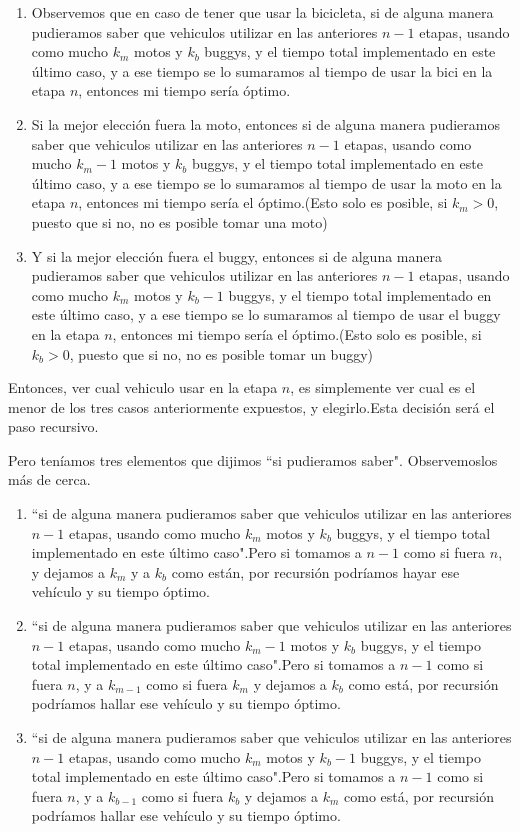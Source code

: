 \begin{enumerate}
	\item Observemos que en caso de tener que usar la bicicleta, si de alguna manera pudieramos saber que vehiculos utilizar en las anteriores $n-1$ etapas, usando como mucho $k_{m}$ motos y $k_{b}$ buggys, y el tiempo total implementado en este último caso, y a ese tiempo se lo sumaramos al tiempo de usar la bici en la etapa $n$, entonces mi tiempo sería óptimo.
	\item Si la mejor elección fuera la moto, entonces si de alguna manera pudieramos saber que vehiculos utilizar en las anteriores $n-1$ etapas, usando como mucho $k_{m}-1$ motos y $k_{b}$ buggys, y el tiempo total implementado en este último caso, y a ese tiempo se lo sumaramos al tiempo de usar la moto en la etapa $n$, entonces mi tiempo sería el óptimo.(Esto solo es posible, si $k_{m}>0$, puesto que si no, no es posible tomar una moto)
	\item Y si la mejor elección fuera el buggy, entonces si de alguna manera pudieramos saber que vehiculos utilizar en las anteriores $n-1$ etapas, usando como mucho $k_{m}$ motos y $k_{b}-1$ buggys, y el tiempo total implementado en este último caso, y a ese tiempo se lo sumaramos al tiempo de usar el buggy en la etapa $n$, entonces mi tiempo sería el óptimo.(Esto solo es posible, si $k_{b}>0$, puesto que si no, no es posible tomar un buggy)
	 
\end{enumerate}

Entonces, ver cual vehiculo usar en la etapa $n$, es simplemente ver cual es el menor de los tres casos anteriormente expuestos, y elegirlo.Esta decisión será el paso recursivo. 

Pero teníamos tres elementos que dijimos ``si pudieramos saber". Observemoslos más de cerca.

\begin{enumerate}
	\item ``si de alguna manera pudieramos saber que vehiculos utilizar en las anteriores $n-1$ etapas, usando como mucho $k_{m}$ motos y $k_{b}$ buggys, y el tiempo total implementado en este último caso".Pero si tomamos a $n-1$ como si fuera $n$, y dejamos a $k_{m}$ y a $k_{b}$ como están, por recursión podríamos hayar ese vehículo y su tiempo óptimo.
	\item ``si de alguna manera pudieramos saber que vehiculos utilizar en las anteriores $n-1$ etapas, usando como mucho $k_{m}-1$ motos y $k_{b}$ buggys, y el tiempo total implementado en este último caso".Pero si tomamos a $n-1$ como si fuera $n$, y a $k_{m-1}$ como si fuera $k_{m}$ y dejamos a $k_{b}$ como está, por recursión podríamos hallar ese vehículo y su tiempo óptimo.
	\item ``si de alguna manera pudieramos saber que vehiculos utilizar en las anteriores $n-1$ etapas, usando como mucho $k_{m}$ motos y $k_{b}-1$ buggys, y el tiempo total implementado en este último caso".Pero si tomamos a $n-1$ como si fuera $n$, y a $k_{b-1}$ como si fuera $k_{b}$ y dejamos a $k_{m}$ como está, por recursión podríamos hallar ese vehículo y su tiempo óptimo.
\end{enumerate}

